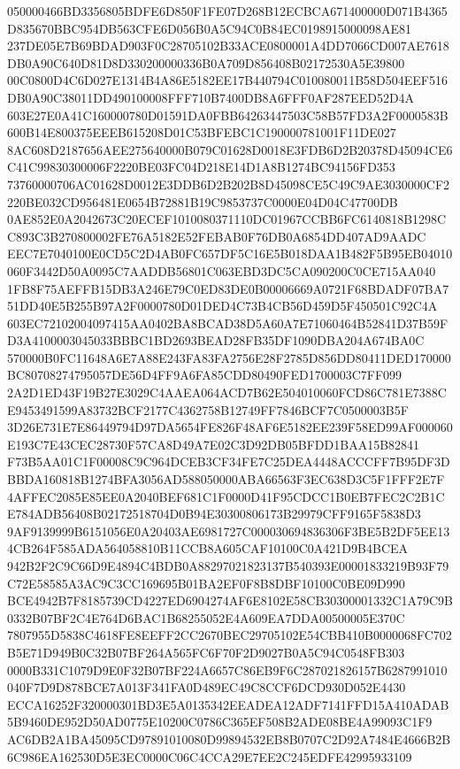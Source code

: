 \documentclass[UTF8,fontset=fandol,zihao=-4,a4paper]{ctexart}
\begin{document}
{{050000466BD3356805BDFE6D850F1FE07D268B12ECBCA671400000D071B4365D835670BBC954DB563CFE6D056B0A5C94C0B84EC0198915000098AE81
237DE05E7B69BDAD903F0C28705102B33ACE0800001A4DD7066CD007AE7618DB0A90C640D81D8D330200000336B0A709D856408B02172530A5E39800
00C0800D4C6D027E1314B4A86E5182EE17B440794C010080011B58D504EEF516DB0A90C38011DD490100008FFF710B7400DB8A6FFF0AF287EED52D4A
603E27E0A41C160000780D01591DA0FBB64263447503C58B57FD3A2F0000583B600B14E800375EEEB615208D01C53BFEBC1C190000781001F11DE027
8AC608D2187656AEE275640000B079C01628D0018E3FDB6D2B20378D45094CE6C41C99830300006F2220BE03FC04D218E14D1A8B1274BC94156FD353
73760000706AC01628D0012E3DDB6D2B202B8D45098CE5C49C9AE3030000CF2220BE032CD956481E0654B72881B19C9853737C0000E04D04C47700DB
0AE852E0A2042673C20ECEF1010080371110DC01967CCBB6FC6140818B1298CC893C3B270800002FE76A5182E52FEBAB0F76DB0A6854DD407AD9AADC
EEC7E7040100E0CD5C2D4AB0FC657DF5C16E5B018DAA1B482F5B95EB04010060F3442D50A0095C7AADDB56801C063EBD3DC5CA090200C0CE715AA040
1FB8F75AEFFB15DB3A246E79C0ED83DE0B00006669A0721F68BDADF07BA751DD40E5B255B97A2F0000780D01DED4C73B4CB56D459D5F450501C92C4A
603EC72102004097415AA0402BA8BCAD38D5A60A7E71060464B52841D37B59FD3A4100003045033BBBC1BD2693BEAD28FB35DF1090DBA204A674BA0C
570000B0FC11648A6E7A88E243FA83FA2756E28F2785D856DD80411DED170000BC80708274795057DE56D4FF9A6FA85CDD80490FED1700003C7FF099
2A2D1ED43F19B27E3029C4AAEA064ACD7B62E504010060FCD86C781E7388CE9453491599A83732BCF2177C4362758B12749FF7846BCF7C0500003B5F
3D26E731E7E86449794D97DA5654FE826F48AF6E5182EE239F58ED99AF000060E193C7E43CEC28730F57CA8D49A7E02C3D92DB05BFDD1BAA15B82841
F73B5AA01C1F00008C9C964DCEB3CF34FE7C25DEA4448ACCCFF7B95DF3DBBDA160818B1274BFA3056AD588050000ABA66563F3EC638D3C5F1FFF2E7F
4AFFEC2085E85EE0A2040BEF681C1F0000D41F95CDCC1B0EB7FEC2C2B1CE784ADB56408B02172518704D0B94E30300806173B29979CFF9165F5838D3
9AF9139999B6151056E0A20403AE6981727C000030694836306F3BE5B2DF5EE134CB264F585ADA564058810B11CCB8A605CAF10100C0A421D9B4BCEA
942B2F2C9C66D9E4894C4BDB0A88297021823137B540393E00001833219B93F79C72E58585A3AC9C3CC169695B01BA2EF0F8B8DBF10100C0BE09D990
BCE4942B7F8185739CD4227ED6904274AF6E8102E58CB30300001332C1A79C9B0332B07BF2C4E764D6BAC1B68255052E4A609EA7DDA00500005E370C
7807955D5838C4618FE8EEFF2CC2670BEC29705102E54CBB410B0000068FC702B5E71D949B0C32B07BF264A565FC6F70F2D9027B0A5C94C0548FB303
0000B331C1079D9E0F32B07BF224A6657C86EB9F6C287021826157B6287991010040F7D9D878BCE7A013F341FA0D489EC49C8CCF6DCD930D052E4430
ECCA16252F320000301BD3E5A0135342EEADEA12ADF7141FFD15A410ADAB5B9460DE952D50AD0775E10200C0786C365EF508B2ADE08BE4A99093C1F9
AC6DB2A1BA45095CD97891010080D99894532EB8B0707C2D92A7484E4666B2B6C986EA162530D5E3EC0000C06C4CCA29E7EE2C245EDFE42995933109
}}
\end{document}
